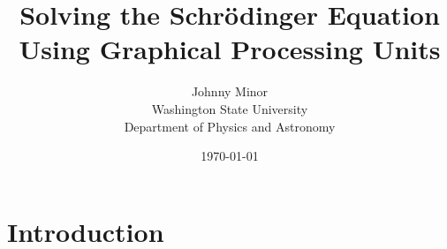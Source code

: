 \documentclass{report}
\theoremstyle{definition}
\begin{document}
\title{Solving the Schr\"odinger Equation Using Graphical Processing Units}
\date{\today}
\author{Johnny Minor \\Washington State University\\ Department of Physics and Astronomy %
}


\maketitle
%
%
%
%
%


\section*{Introduction}

\end{document}
